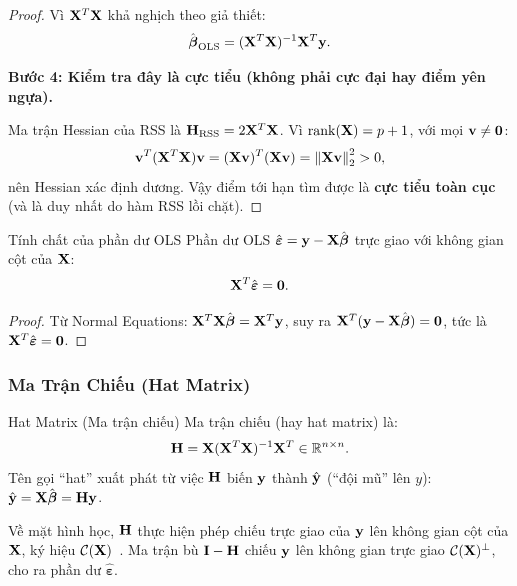 \begin{proof}
Vì $\mathbf{X}^T\mathbf{X}$ khả nghịch theo giả thiết:
\[
    \hat{\boldsymbol{\beta}}_{\mathrm{OLS}}
    = (\mathbf{X}^T\mathbf{X})^{-1}\mathbf{X}^T\mathbf{y}.
\]

\medskip
\noindent\textbf{Bước 4: Kiểm tra đây là cực tiểu (không phải cực đại hay điểm yên ngựa).}

Ma trận Hessian của RSS là $\mathbf{H}_{\mathrm{RSS}} = 2\mathbf{X}^T\mathbf{X}$.
Vì $\operatorname{rank}(\mathbf{X}) = p+1$, với mọi $\mathbf{v} \neq \mathbf{0}$:
\[
    \mathbf{v}^T(\mathbf{X}^T\mathbf{X})\mathbf{v} = (\mathbf{X}\mathbf{v})^T(\mathbf{X}\mathbf{v}) = \left\lVert\mathbf{X}\mathbf{v}\right\rVert_2^2 > 0,
\]
nên Hessian xác định dương. Vậy điểm tới hạn tìm được là \textbf{cực tiểu toàn cục}
(và là duy nhất do hàm RSS lồi chặt).
\end{proof}

\begin{mycor}{Tính chất của phần dư OLS}{}
Phần dư OLS $\hat{\boldsymbol{\varepsilon}} = \mathbf{y} - \mathbf{X}\hat{\boldsymbol{\beta}}$
trực giao với không gian cột của $\mathbf{X}$:
\[
    \mathbf{X}^T\hat{\boldsymbol{\varepsilon}} = \mathbf{0}.
\]
\end{mycor}

\begin{proof}
Từ Normal Equations:
$\mathbf{X}^T\mathbf{X}\hat{\boldsymbol{\beta}} = \mathbf{X}^T\mathbf{y}$,
suy ra $\mathbf{X}^T(\mathbf{y} - \mathbf{X}\hat{\boldsymbol{\beta}}) = \mathbf{0}$,
tức là $\mathbf{X}^T\hat{\boldsymbol{\varepsilon}} = \mathbf{0}$.
\end{proof}

\subsubsection{Ma Trận Chiếu (Hat Matrix)}


\begin{mydef}{Hat Matrix (Ma trận chiếu)}{}
Ma trận chiếu (hay hat matrix) là:
\[
    \mathbf{H} = \mathbf{X}(\mathbf{X}^T\mathbf{X})^{-1}\mathbf{X}^T \in \mathbb{R}^{n \times n}.
\]
Tên gọi ``hat'' xuất phát từ việc $\mathbf{H}$ biến $\mathbf{y}$ thành
$\hat{\mathbf{y}}$ (``đội mũ'' lên $y$):
$\hat{\mathbf{y}} = \mathbf{X}\hat{\boldsymbol{\beta}} = \mathbf{H}\mathbf{y}$.
\end{mydef}

Về mặt hình học, $\mathbf{H}$ thực hiện phép chiếu trực giao của $\mathbf{y}$ lên
không gian cột của $\mathbf{X}$, ký hiệu $\mathcal{C}(\mathbf{X})$~\cite{trefethen1997}.
Ma trận bù $\mathbf{I} - \mathbf{H}$ chiếu $\mathbf{y}$ lên không gian trực giao
$\mathcal{C}(\mathbf{X})^{\perp}$, cho ra phần dư $\hat{\boldsymbol{\varepsilon}}$.

